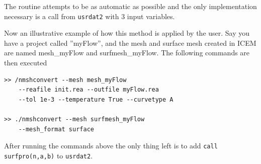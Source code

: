 The routine attempts to be as automatic as possible and the only implementation necessary is 
a call from \verb|usrdat2| with 3 input variables.

Now an illustrative example of how this method is applied by the user. Say you have a project
called ''myFlow'', and the mesh and surface mesh created in ICEM are named mesh\_myFlow and 
surfmesh\_myFlow. The following commands are then executed

%

% 
\begingroup
\fontsize{12pt}{14pt}
\begin{lstlisting}[escapechar=|,frame=none]
>> /nmshconvert --mesh mesh_myFlow 
    --reafile init.rea --outfile myFlow.rea
    --tol 1e-3 --temperature True --curvetype A

>> ./nmshconvert --mesh surfmesh_myFlow 
    --mesh_format surface

\end{lstlisting}
\endgroup
After running the commands above the only thing left is to 
add \verb|call surfpro(n,a,b)| to \verb|usrdat2|.
% 
% 
